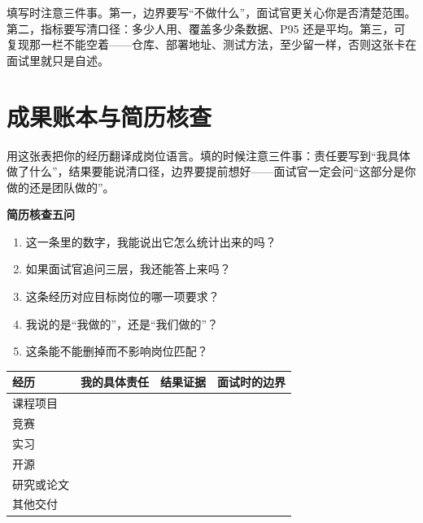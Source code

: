 \documentclass[UTF8,zihao=5,openany]{ctexbook}
\begin{document}
填写时注意三件事。第一，边界要写“不做什么”，面试官更关心你是否清楚范围。第二，指标要写清口径：多少人用、覆盖多少条数据、P95 还是平均。第三，可复现那一栏不能空着——仓库、部署地址、测试方法，至少留一样，否则这张卡在面试里就只是自述。

\section{成果账本与简历核查}
用这张表把你的经历翻译成岗位语言。填的时候注意三件事：责任要写到“我具体做了什么”，结果要能说清口径，边界要提前想好——面试官一定会问“这部分是你做的还是团队做的”。

\begin{toolbox}
\textbf{简历核查五问}\par\smallskip
\begin{enumerate}
\item 这一条里的数字，我能说出它怎么统计出来的吗？
\item 如果面试官追问三层，我还能答上来吗？
\item 这条经历对应目标岗位的哪一项要求？
\item 我说的是“我做的”，还是“我们做的”？
\item 这条能不能删掉而不影响岗位匹配？
\end{enumerate}
\end{toolbox}


\begin{longtable}{p{}p{}p{}p{}}
\toprule
经历 & 我的具体责任 & 结果证据 & 面试时的边界 \\
\midrule
\endhead
课程项目 & & & \\
竞赛 & & & \\
实习 & & & \\
开源 & & & \\
研究或论文 & & & \\
其他交付 & & & \\
\bottomrule
\end{longtable}
\end{document}
